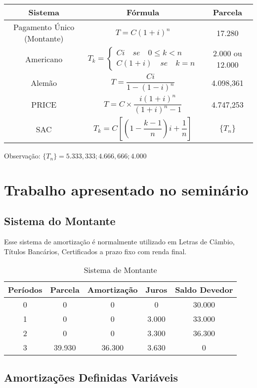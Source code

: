 \begin{tabular}{|c|c|c|}
    \hline
       Sistema  &  Fórmula & Parcela\\
    \hline
       Pagamento Único (Montante)  & $T=C(1+i)^n$ & 17.280 \\
    \hline
    Americano &  $T_{ k }=\begin{cases} Ci\quad se\quad 0\le k<n \\ C(1+i)\quad se\quad k=n \end{cases}$  &  2.000 ou 12.000 \\
    \hline
    Alemão     & $T=\dfrac{Ci}{1-(1-i)^n}$ & 4.098,361 \\
    \hline
    PRICE     & $T=C \times \dfrac{i(1+i)^n}{(1+i)^n-1}$  & 4.747,253 \\
    \hline
    SAC     & $T_{k}=C\left[ \left( 1-\dfrac{k-1}{n}  \right) i+\dfrac{1}{n}  \right]$ & $\{T_n\}$ \\
    \hline
\end{tabular}

Observação: $\{T_n\}=5.333,333; 4.666,666; 4.000$
\section{Trabalho apresentado no seminário}
\subsection{Sistema do Montante}
Esse sistema de amortização é normalmente utilizado em Letras de Câmbio, Títulos Bancários, Certificados a prazo fixo com renda final.

\begin{table}[h]
    \centering
    \begin{tabular}{|c|c|c|c|c|}
    \hline
       Períodos  &  Parcela & Amortização & Juros & Saldo Devedor\\
    \hline
    0  & 0 & 0 & 0 & 30.000\\
    \hline
    1  & 0 & 0 & 3.000 & 33.000\\
    \hline
    2     & 0 & 0 & 3.300 & 36.300\\
    \hline
    3     & 39.930 & 36.300 & 3.630 & 0\\
    \hline
       \end{tabular}
    \caption{Sistema de Montante}
    \label{tab:my_label}
\end{table}

\subsection{Amortizações Definidas Variáveis}

